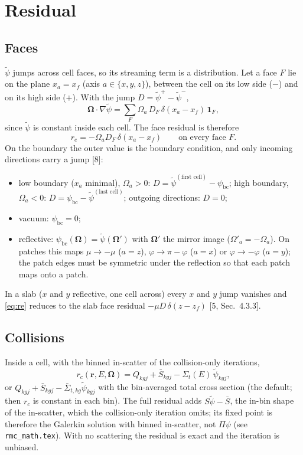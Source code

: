 \documentclass[11pt]{article}
\newcommand{\tpsi}{\tilde\psi}
\newcommand{\Sbar}{\bar S}
\newcommand{\Sigt}{\Sigma_t}
\newcommand{\Om}{\boldsymbol\Omega}
\begin{document}
\section{Residual}

\subsection{Faces}

$\tpsi$ jumps across cell faces, so its streaming term is a distribution. Let a face
$F$ lie on the plane $x_a=x_f$ (axis $a\in\{x,y,z\}$), between the cell on its low
side ($-$) and on its high side ($+$). With the jump $D=\tpsi^+-\tpsi^-$,
\begin{equation}
  \Om\cdot\nabla\tpsi = \sum_F \Omega_a\, D_F\, \delta(x_a-x_f)\,\mathbf 1_F ,
\end{equation}
since $\tpsi$ is constant inside each cell. The face residual is therefore
\begin{equation}
  r_e = -\Omega_a D_F\, \delta(x_a - x_f) \qquad\text{on every face } F .
  \label{eq:re}
\end{equation}
On the boundary the outer value is the boundary condition, and only incoming
directions carry a jump [8]:
\begin{itemize}
  \item low boundary ($x_a$ minimal), $\Omega_a>0$: $D = \tpsi^{(\text{first cell})}
  - \psi_{\text{bc}}$; high boundary, $\Omega_a<0$: $D = \psi_{\text{bc}} -
  \tpsi^{(\text{last cell})}$; outgoing directions: $D=0$;
  \item vacuum: $\psi_{\text{bc}}=0$;
  \item reflective: $\psi_{\text{bc}}(\Om) = \tpsi(\Om')$ with $\Om'$ the mirror image
  ($\Omega'_a=-\Omega_a$). On patches this maps $\mu\to-\mu$ ($a=z$),
  $\varphi\to\pi-\varphi$ ($a=x$) or $\varphi\to-\varphi$ ($a=y$); the patch edges
  must be symmetric under the reflection so that each patch maps onto a patch.
\end{itemize}
In a slab ($x$ and $y$ reflective, one cell across) every $x$ and $y$ jump vanishes
and \eqref{eq:re} reduces to the slab face residual $-\mu D\,\delta(z-z_f)$ [5,
Sec.~4.3.3].

\subsection{Collisions}

Inside a cell, with the binned in-scatter of the collision-only iterations,
\begin{equation}
  r_c(\mathbf r,E,\Om) = Q_{kgj} + \Sbar_{kgj} - \Sigt(E)\,\tpsi_{kgj} ,
\end{equation}
or $Q_{kgj} + \Sbar_{kgj} - \bar\Sigma_{t,kg}\tpsi_{kgj}$ with the bin-averaged total
cross section (the default; then $r_c$ is constant in each bin). The full residual
adds $S\tpsi - \Sbar$, the in-bin shape of the in-scatter, which the collision-only
iteration omits; its fixed point is therefore the Galerkin solution with binned
in-scatter, not $\Pi\psi$ (see \texttt{rmc\_math.tex}). With no scattering the
residual is exact and the iteration is unbiased.
\end{document}
